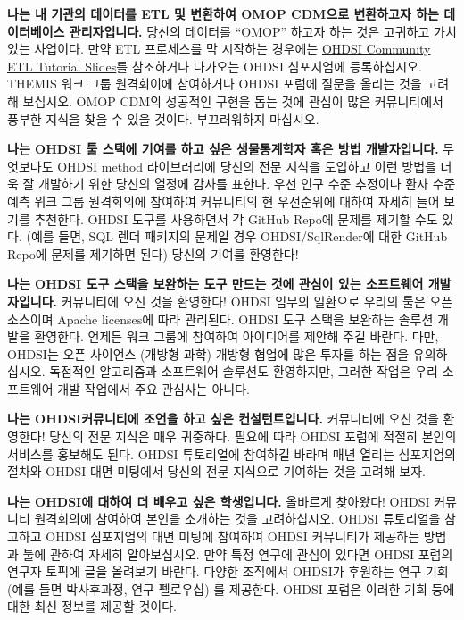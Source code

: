 \documentclass[11pt]{book}
\theoremstyle{definition}
\theoremstyle{definition}
\theoremstyle{definition}
\theoremstyle{remark}
\begin{document}
\textbf{나는 내 기관의 데이터를 ETL 및 변환하여 OMOP CDM으로 변환하고자
하는 데이터베이스 관리자입니다.} 당신의 데이터를 ``OMOP'' 하고자 하는
것은 고귀하고 가치 있는 사업이다. 만약 ETL 프로세스를 막 시작하는
경우에는
\href{https://www.ohdsi-europe.org/images/symposium-2019/tutorials/OHDSI_Vocabulary_CDM_Tutorial.pdf}{OHDSI
Community ETL Tutorial Slides}를 참조하거나 다가오는 OHDSI 심포지엄에
등록하십시오. THEMIS 워크 그룹 원격회이에 참여하거나 OHDSI 포럼에 질문을
올리는 것을 고려해 보십시오. OMOP CDM의 성공적인 구현을 돕는 것에 관심이
많은 커뮤니티에서 풍부한 지식을 찾을 수 있을 것이다. 부끄러워하지
마십시오.

\textbf{나는 OHDSI 툴 스택에 기여를 하고 싶은 생물통계학자 혹은 방법
개발자입니다.} 무엇보다도 OHDSI method 라이브러리에 당신의 전문 지식을
도입하고 이런 방법을 더욱 잘 개발하기 위한 당신의 열정에 감사를 표한다.
우선 인구 수준 추정이나 환자 수준 예측 워크 그룹 원격회의에 참여하여
커뮤니티의 현 우선순위에 대하여 자세히 들어 보기를 추천한다. OHDSI
도구를 사용하면서 각 GitHub Repo에 문제를 제기할 수도 있다. (예를 들면,
SQL 렌더 패키지의 문제일 경우 OHDSI/SqlRender에 대한 GitHub Repo에
문제를 제기하면 된다) 당신의 기여를 환영한다!

\textbf{나는 OHDSI 도구 스택을 보완하는 도구 만드는 것에 관심이 있는
소프트웨어 개발자입니다.} 커뮤니티에 오신 것을 환영한다! OHDSI 임무의
일환으로 우리의 툴은 오픈소스이며 Apache licenses에 따라 관리된다. OHDSI
도구 스택을 보완하는 솔루션 개발을 환영한다. 언제든 워크 그룹에 참여하여
아이디어를 제안해 주길 바란다. 다만, OHDSI는 오픈 사이언스 (개방형 과학)
개방형 협업에 많은 투자를 하는 점을 유의하십시오. 독점적인 알고리즘과
소프트웨어 솔루션도 환영하지만, 그러한 작업은 우리 소프트웨어 개발
작업에서 주요 관심사는 아니다.

\textbf{나는 OHDSI커뮤니티에 조언을 하고 싶은 컨설턴트입니다.}
커뮤니티에 오신 것을 환영한다! 당신의 전문 지식은 매우 귀중하다. 필요에
따라 OHDSI 포럼에 적절히 본인의 서비스를 홍보해도 된다. OHDSI 튜토리얼에
참여하길 바라며 매년 열리는 심포지엄의 절차와 OHDSI 대면 미팅에서 당신의
전문 지식으로 기여하는 것을 고려해 보자.

\textbf{나는 OHDSI에 대하여 더 배우고 싶은 학생입니다.} 올바르게
찾아왔다! OHDSI 커뮤니티 원격회의에 참여하여 본인을 소개하는 것을
고려하십시오. OHDSI 튜토리얼을 참고하고 OHDSI 심포지엄의 대면 미팅에
참여하여 OHDSI 커뮤니티가 제공하는 방법과 툴에 관하여 자세히
알아보십시오. 만약 특정 연구에 관심이 있다면 OHDSI 포럼의 연구자 토픽에
글을 올려보기 바란다. 다양한 조직에서 OHDSI가 후원하는 연구 기회 (예를
들면 박사후과정, 연구 펠로우십) 를 제공한다. OHDSI 포럼은 이러한 기회
등에 대한 최신 정보를 제공할 것이다.
\end{document}
